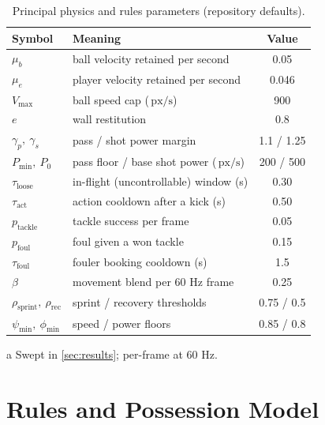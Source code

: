 \documentclass[10pt,twocolumn]{article}
\newcommand{\pxs}{\ensuremath{\,\mathrm{px/s}}}
\begin{document}
\begin{table}[t]
\centering\small
\begin{threeparttable}
\caption{Principal physics and rules parameters (repository defaults).}
\label{tab:physparams}
\begin{tabular}{@{}llS[table-format=3.2]@{}}
\toprule
Symbol & Meaning & {Value} \\
\midrule
$\mu_b$ & ball velocity retained per second & 0.05 \\
$\mu_e$ & player velocity retained per second & 0.046 \\
$V_{\max}$ & ball speed cap (\pxs) & 900 \\
$e$ & wall restitution & 0.8 \\
$\gamma_p,\ \gamma_s$ & pass / shot power margin & {1.1 / 1.25} \\
$P_{\min},\ P_0$ & pass floor / base shot power (\pxs) & {200 / 500} \\
$\tau_{\text{loose}}$ & in-flight (uncontrollable) window (s) & 0.30 \\
$\tau_{\text{act}}$ & action cooldown after a kick (s) & 0.50 \\
$p_{\text{tackle}}$ & tackle success per frame & 0.05 \\
$p_{\text{foul}}$ & foul given a won tackle & 0.15 \\
$\tau_{\text{foul}}$ & fouler booking cooldown (s) & 1.5 \\
$\beta$ & movement blend per 60 Hz frame & 0.25 \\
$\rho_{\text{sprint}},\ \rho_{\text{rec}}$ & sprint / recovery thresholds & {0.75 / 0.5} \\
$\psi_{\min},\ \phi_{\min}$ & speed / power floors & {0.85 / 0.8} \\
\bottomrule
\end{tabular}
\begin{tablenotes}\footnotesize
\item[a] Swept in \cref{sec:results}; per-frame at 60 Hz.
\end{tablenotes}
\end{threeparttable}
\end{table}

\section{Rules and Possession Model}\label{sec:rules}
\end{document}
